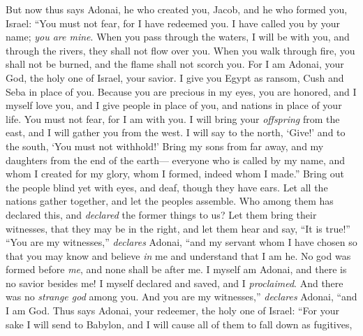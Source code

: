 \begin{biblechapter} %
 But now thus says Adonai,
\verse he who created you, Jacob, 
and he who formed you, Israel: 
“You must not fear, for I have redeemed you. 
I have called you by your name; \textit{you are mine}.
\verse When you pass through the waters, I will be with you, 
and through the rivers, they shall not flow over you. 
When you walk through fire, you shall not be burned, 
and the flame shall not scorch you.
\verse For I am Adonai, your God, 
the holy one of Israel, your savior. 
I give you Egypt as ransom, 
Cush and Seba in place of you.
\verse Because you are precious in my eyes, 
you are honored, and I myself love you, 
and I give people in place of you, 
and nations in place of your life.
\verse You must not fear, 
for I am with you. 
I will bring your \textit{offspring} from the east, 
and I will gather you from the west.
\verse I will say to the north, ‘Give!’ 
and to the south, ‘You must not withhold!’ 
Bring my sons from far away, 
and my daughters from the end of the earth—
\verse everyone who is called by my name, 
and whom I created for my glory, 
whom I formed, 
indeed whom I made.”
\verse Bring out the people blind yet with eyes, 
and deaf, though they have ears.
\verse Let all the nations gather together, 
and let the peoples assemble. 
Who among them has declared this, 
and \textit{declared} the former things to us? 
Let them bring their witnesses, that they may be in the right, 
and let them hear and say, “It is true!”
\verse “You are my witnesses,” \textit{declares} Adonai, 
“and my servant whom I have chosen 
so that you may know and believe \textit{in} me 
and understand that I am he. 
No god was formed before \textit{me}, 
and none shall be after me.
\verse I myself am Adonai, 
and there is no savior besides me!
\verse I myself declared and saved, 
and I \textit{proclaimed}. And there was no \textit{strange god} among you. 
And you are my witnesses,” \textit{declares} Adonai, 
“and I am God.
 Thus says Adonai, your redeemer, 
the holy one of Israel: 
“For your sake I will send to Babylon, 
and I will cause all of them to fall down as fugitives, 

\end{biblechapter}
